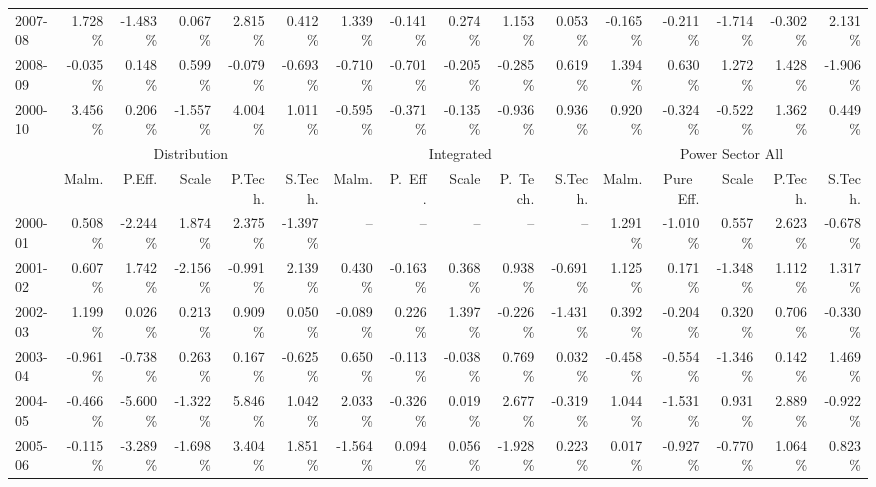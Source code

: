 \begin{sidewaystable}[ht]
{\begin{tabular}{l|rrrrr|rrrrr|rrrrr}
2007-08  &   1.728 \%  &  -1.483 \%  &   0.067 \%  &   2.815 \%  &   0.412 \%  &   1.339 \%  &  -0.141 \%  &   0.274 \%  &   1.153 \%  &   0.053 \%  &  -0.165 \%  &  -0.211 \%  &  -1.714 \%  &  -0.302 \%  &   2.131 \% \\
2008-09  &  -0.035 \%  &   0.148 \%  &   0.599 \%  &  -0.079 \%  &  -0.693 \%  &  -0.710 \%  &  -0.701 \%  &  -0.205 \%  &  -0.285 \%  &   0.619 \%  &   1.394 \%  &   0.630 \%  &   1.272 \%  &   1.428 \%  &  -1.906 \% \\
\midrule
2000-10  &  3.456 \%  &  0.206 \%  &  -1.557 \%  &  4.004 \%  &  1.011 \%  &  -0.595 \%  &  -0.371 \%  &  -0.135 \%  &  -0.936 \%  &  0.936 \%  &  0.920 \%  &  -0.324 \%  &  -0.522 \%  &  1.362 \%  &  0.449 \% \\
\midrule
  & \multicolumn{5}{c}{Distribution} & \multicolumn{5}{c}{Integrated}  & \multicolumn{5}{c}{Power Sector All}\\
  \midrule  & Malm. & P.Eff. & Scale & P.Tech. & S.Tech. & Malm. & P.~Eff. & Scale & P.~Tech. & S.Tech. & Malm. & Pure~Eff. & Scale & P.Tech. & S.Tech. \\ \midrule
2000-01  &   0.508 \%  &  -2.244 \%  &   1.874 \%  &   2.375 \%  &  -1.397 \%  &     --  &     --  &     --  &     --  &     --  &  1.291 \%  &  -1.010 \%  &  0.557 \%  &  2.623 \%  &  -0.678 \% \\
2001-02  &   0.607 \%  &   1.742 \%  &  -2.156 \%  &  -0.991 \%  &   2.139 \%  &   0.430 \%  &  -0.163 \%  &   0.368 \%  &   0.938 \%  &  -0.691 \%  &  1.125 \%  &  0.171 \%  &  -1.348 \%  &  1.112 \%  &  1.317 \% \\
2002-03  &   1.199 \%  &   0.026 \%  &   0.213 \%  &   0.909 \%  &   0.050 \%  &  -0.089 \%  &   0.226 \%  &   1.397 \%  &  -0.226 \%  &  -1.431 \%  &  0.392 \%  &  -0.204 \%  &  0.320 \%  &  0.706 \%  &  -0.330 \% \\
2003-04  &  -0.961 \%  &  -0.738 \%  &   0.263 \%  &   0.167 \%  &  -0.625 \%  &   0.650 \%  &  -0.113 \%  &  -0.038 \%  &   0.769 \%  &   0.032 \%  &  -0.458 \%  &  -0.554 \%  &  -1.346 \%  &  0.142 \%  &  1.469 \% \\
2004-05  &  -0.466 \%  &  -5.600 \%  &  -1.322 \%  &   5.846 \%  &   1.042 \%  &   2.033 \%  &  -0.326 \%  &   0.019 \%  &   2.677 \%  &  -0.319 \%  &  1.044 \%  &  -1.531 \%  &  0.931 \%  &  2.889 \%  &  -0.922 \% \\
2005-06  &  -0.115 \%  &  -3.289 \%  &  -1.698 \%  &   3.404 \%  &   1.851 \%  &  -1.564 \%  &   0.094 \%  &   0.056 \%  &  -1.928 \%  &   0.223 \%  &  0.017 \%  &  -0.927 \%  &  -0.770 \%  &  1.064 \%  &  0.823 \% \\

\end{tabular}}
\end{sidewaystable}
